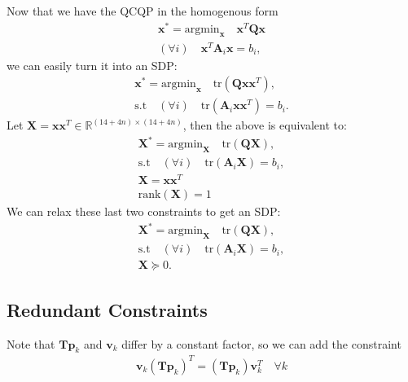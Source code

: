 \documentclass{article}
\newcommand{\mbf}[1]{\mathbf{#1}}
\begin{document}
Now that we have the QCQP in the homogenous form
\begin{align}
\mbf{x}^* = \text{argmin}_{\mbf{x}} \quad \mbf{x}^T \mbf{Q} \mbf{x}\\
(\forall i) \quad \mbf{x}^T \mbf{A}_i \mbf{x} = b_i,
\end{align}
we can easily turn it into an SDP:
\begin{align}
\mbf{x}^* = \text{argmin}_{\mbf{x}} \quad \text{tr}(\mbf{Q}\mbf{x}\mbf{x}^T),\\
\text{s.t}\quad (\forall i) \quad \text{tr}(\mbf{A}_i \mbf{x} \mbf{x}^T) = b_i.
\end{align}
Let $\mbf{X} = \mbf{x}\mbf{x}^T \in \mathbb{R}^{(14 + 4n) \times (14 + 4n)}$, then the above is equivalent to:
\begin{align}
\mbf{X}^* = \text{argmin}_{\mbf{X}} \quad \text{tr}(\mbf{Q}\mbf{X}),\\
\text{s.t}\quad (\forall i) \quad \text{tr}(\mbf{A}_i \mbf{X}) = b_i,\\
\mbf{X} = \mbf{x} \mbf{x}^T\\
\text{rank}(\mbf{X}) = 1
\end{align}
We can relax these last two constraints to get an SDP:
\begin{align}
\mbf{X}^* = \text{argmin}_{\mbf{X}} \quad \text{tr}(\mbf{Q}\mbf{X}),\\
\text{s.t}\quad (\forall i) \quad \text{tr}(\mbf{A}_i \mbf{X}) = b_i,\\
\mbf{X} \succeq 0.
\end{align}

\subsection{Redundant Constraints}

Note that $\mbf{T}\mbf{p}_k$ and $\mbf{v}_k$ differ by a constant factor, so we can add
the constraint
\begin{align}
\mbf{v}_k (\mbf{T} \mbf{p}_k)^T = (\mbf{T} \mbf{p}_k) \mbf{v}_k^T \quad \forall k \\
\end{align}
\end{document}
